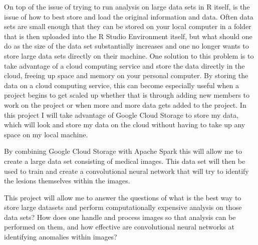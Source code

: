 \documentclass[12pt]{article}
\begin{document}
On top of the issue of trying to run analysis on large data sets in R
itself, is the issue of how to best store and load the original
information and data. Often data sets are small enough that they can be
stored on your local computer in a folder that is then uploaded into the
R Studio Environment itself, but what should one do as the size of the
data set substantially increases and one no longer wants to store large
data sets directly on their machine. One solution to this problem is to
take advantage of a cloud computing service and store the data directly
in the cloud, freeing up space and memory on your personal computer. By
storing the data on a cloud computing service, this can become
especially useful when a project begins to get scaled up whether that is
through adding new members to work on the project or when more and more
data gets added to the project. In this project I will take advantage of
Google Cloud Storage to store my data, which will look and store my data
on the cloud without having to take up any space on my local machine.

By combining Google Cloud Storage with Apache Spark this will allow me
to create a large data set consisting of medical images. This data set
will then be used to train and create a convolutional neural network
that will try to identify the lesions themselves within the images.

This project will allow me to answer the questions of what is the best
way to store large datasets and perform computationally expensive
analysis on those data sets? How does one handle and process images so
that analysis can be performed on them, and how effective are
convolutional neural networks at identifying anomalies within images?



\end{document}
